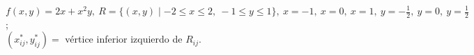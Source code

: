 \item $f(x, y) = 2x + x^2y, \ R = \{(x, y) \mid -2 \le x \le 2, \ -1 \le y \le 1\}, \ x = -1, \ x = 0, \ x = 1, \ y = -\frac{1}{2}, \ y = 0, \ y = \frac{1}{2}$; \\ $(x_{ij}^*, y_{ij}^*) =$ vértice inferior izquierdo de $R_{ij}$.
